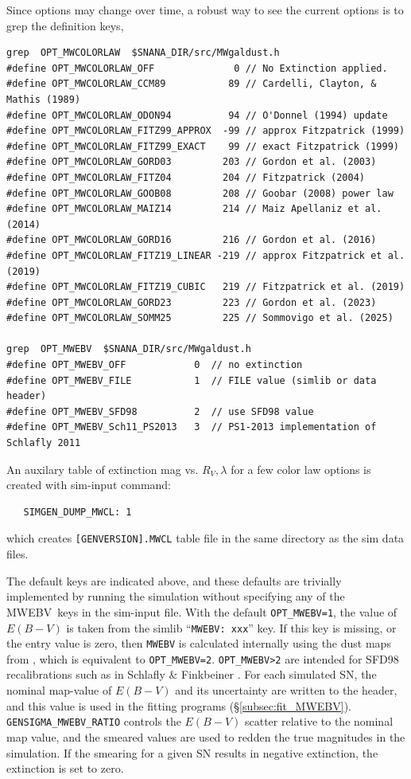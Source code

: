 \documentclass[12pt]{article}
\newcommand{\mwebv}{MWEBV}
\begin{document}
{Since options may change over time, a robust
way to see the current options is to grep the definition keys,
%
\begin{Verbatim}[frame=single]
grep  OPT_MWCOLORLAW  $SNANA_DIR/src/MWgaldust.h
#define OPT_MWCOLORLAW_OFF              0 // No Extinction applied.
#define OPT_MWCOLORLAW_CCM89           89 // Cardelli, Clayton, & Mathis (1989)
#define OPT_MWCOLORLAW_ODON94          94 // O'Donnel (1994) update
#define OPT_MWCOLORLAW_FITZ99_APPROX  -99 // approx Fitzpatrick (1999)
#define OPT_MWCOLORLAW_FITZ99_EXACT    99 // exact Fitzpatrick (1999)
#define OPT_MWCOLORLAW_GORD03         203 // Gordon et al. (2003)
#define OPT_MWCOLORLAW_FITZ04         204 // Fitzpatrick (2004)
#define OPT_MWCOLORLAW_GOOB08         208 // Goobar (2008) power law
#define OPT_MWCOLORLAW_MAIZ14         214 // Maiz Apellaniz et al. (2014)
#define OPT_MWCOLORLAW_GORD16         216 // Gordon et al. (2016)
#define OPT_MWCOLORLAW_FITZ19_LINEAR -219 // approx Fitzpatrick et al. (2019)
#define OPT_MWCOLORLAW_FITZ19_CUBIC   219 // Fitzpatrick et al. (2019)
#define OPT_MWCOLORLAW_GORD23         223 // Gordon et al. (2023)
#define OPT_MWCOLORLAW_SOMM25         225 // Sommovigo et al. (2025)

grep  OPT_MWEBV  $SNANA_DIR/src/MWgaldust.h
#define OPT_MWEBV_OFF            0  // no extinction
#define OPT_MWEBV_FILE           1  // FILE value (simlib or data header)
#define OPT_MWEBV_SFD98          2  // use SFD98 value
#define OPT_MWEBV_Sch11_PS2013   3  // PS1-2013 implementation of Schlafly 2011
\end{Verbatim}

An auxilary table of extinction mag vs. $R_V,\lambda$ for a few color law options
is created with sim-input command:
\begin{Verbatim}
   SIMGEN_DUMP_MWCL: 1
\end{Verbatim}
which creates {\tt [GENVERSION].MWCL} table file in the same directory as
the sim data files.

The default keys are indicated above, and these defaults are 
trivially implemented by running the simulation without specifying
any of the \mwebv\ keys in the sim-input file.
With the default {\tt OPT\_MWEBV=1},
the value of $E(B-V)$ is taken from the simlib 
``{\tt MWEBV: xxx}'' key. If this key is missing,
or the entry value is zero, then {\tt MWEBV} is calculated
internally using the dust maps from \cite{Schlegel_98},
which is equivalent to {\tt OPT\_MWEBV=2}.
{\tt OPT\_MWEBV>2} are intended for SFD98 recalibrations
such as in Schlafly \& Finkbeiner \cite{Schlafly_11}. 
For each simulated SN, the nominal map-value of $E(B-V)$ and its
uncertainty are written to the header, and this value is used
in the fitting programs (\S\ref{subsec:fit_MWEBV}).
{\tt GENSIGMA\_MWEBV\_RATIO} controls the $E(B-V)$ scatter
relative to the nominal map value,
and the smeared values are used to redden the true
magnitudes in the simulation.
If the smearing for a given SN results in negative extinction, 
the extinction is set to zero.

}
\end{document}
